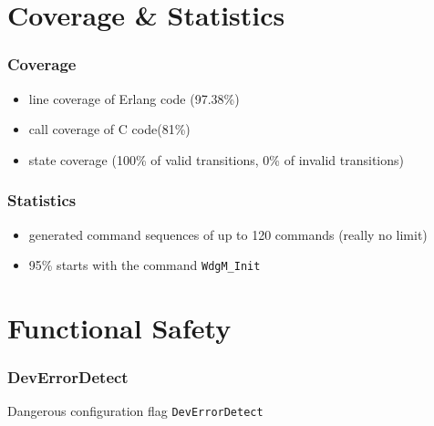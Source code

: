 \documentclass{beamer}
\begin{document}
\section{Coverage \& Statistics}

\begin{frame}
  \frametitle{Coverage}
  \begin{itemize}
    \item line coverage of Erlang code (97.38\%)
    \item call coverage of C code(81\%)
    \item state coverage (100\% of valid transitions, 0\% of invalid transitions)
  \end{itemize}
\end{frame}


\begin{frame}[fragile]
  \frametitle{Statistics}
  \begin{itemize}
    \item generated command sequences of up to 120 commands (really no limit)
    \item 95\% starts with the command \verb!WdgM_Init!
  \end{itemize}
\end{frame}

\section{Functional Safety}
\begin{frame}[fragile]
  \frametitle{DevErrorDetect}
  Dangerous configuration flag \verb!DevErrorDetect!
\end{frame}

\end{document}
